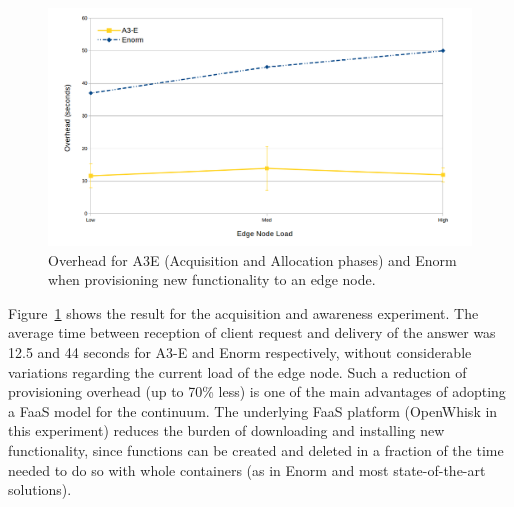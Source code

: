 \begin{figure}	
	\centering
	\includegraphics[width=.9\textwidth]{figs/a3e-enorm-deployment}
	\vspace{-.3cm}
	\caption{Overhead for A3E (Acquisition and Allocation phases) and Enorm when provisioning new functionality to an edge node.}
	\label{fig:exp-a3e-enorm-deployment}
\end{figure}


Figure~\ref{fig:exp-a3e-enorm-deployment} shows the result for the acquisition and awareness experiment. The average time between reception of client request and delivery of the answer was 12.5 and 44 seconds for A3-E and Enorm respectively, without considerable variations regarding the current load of the edge node. Such a reduction of provisioning overhead (up to 70\% less) is one of the main advantages of adopting a FaaS model for the continuum. The underlying FaaS platform (OpenWhisk in this experiment) reduces the burden of downloading and installing new functionality, since functions can be created and deleted in a fraction of the time needed to do so with whole containers (as in Enorm and most state-of-the-art solutions). 







